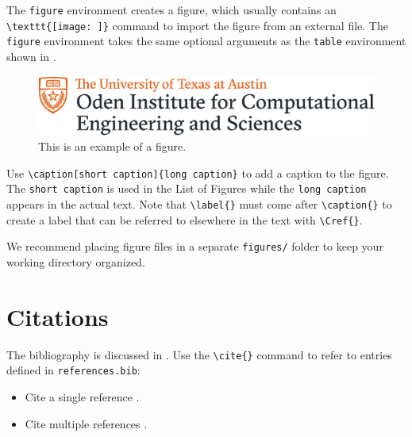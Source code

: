 The \verb"figure" environment
creates a figure, which usually contains an \verb"\texttt{[image: ]}" command to import the figure from an external file.
The \verb"figure" environment takes the same optional arguments as the \verb"table" environment shown in .

\begin{figure}[th]
    \centering
    \includegraphics[width=.7\textwidth]{figures/oden.pdf}
    \caption[An example figure.]{This is an example of a figure.}
    \label{figure:example}
\end{figure}

Use \verb"\caption[short caption]{long caption}" to add a caption to the figure.
The \texttt{short caption} is used in the List of Figures
%
while the \texttt{long caption} appears in the actual text.
Note that \verb"\label{}" must come after \verb"\caption{}" to create a label that can be referred to elsewhere in the text with \verb"\Cref{}".

We recommend placing figure files in a separate \verb"figures/" folder to keep your working directory organized.


\section{Citations} %

The bibliography is discussed in .
Use the \verb"\cite{}" command to refer to entries defined in \texttt{references.bib}:
\begin{itemize}
    \item Cite a single reference \cite{knuth1984texbook}.
    \item Cite multiple references \cite{lamport1994latex, goosens1994latex}.
\end{itemize}
